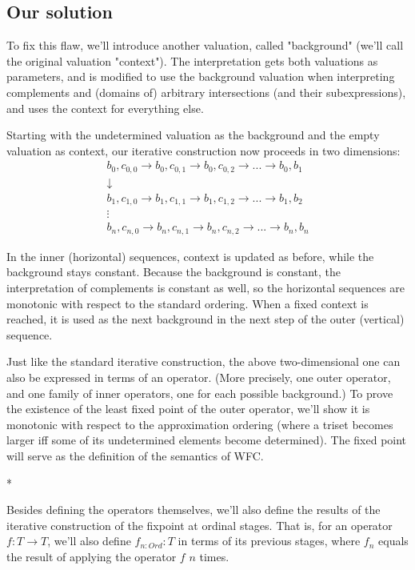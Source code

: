 \documentclass[oneside,12pt]{book}
\theoremstyle{definition}
\theoremstyle{remark}
\newcommand{\sectionStars}{
\bigskip
*\quad*\quad*
\medskip
}
\begin{document}
\subsection{Our solution}
To fix this flaw, we'll introduce another valuation, called "background"
(we'll call the original valuation "context"). The interpretation gets both
valuations as parameters, and is modified to use the background valuation when
interpreting complements and (domains of) arbitrary intersections (and their
subexpressions), and uses the context for everything else.

Starting with the undetermined valuation as the background and the empty valuation
as context, our iterative construction now proceeds in two dimensions:
\begin{gather*}
  b_0, c_{0,0} \rightarrow b_0, c_{0,1} \rightarrow b_0, c_{0,2}
    \rightarrow ... \rightarrow b_0, b_1 \\
  \downarrow \\
  b_1, c_{1,0} \rightarrow b_1, c_{1,1} \rightarrow b_1, c_{1,2}
    \rightarrow ... \rightarrow b_1, b_2 \\
  \vdots \\
  b_n, c_{n,0} \rightarrow b_n, c_{n,1} \rightarrow b_n, c_{n,2}
    \rightarrow ... \rightarrow b_n, b_n
\end{gather*}

In the inner (horizontal) sequences, context is updated as before,
while the background stays constant. Because the background is constant,
the interpretation of complements is constant as well, so the horizontal
sequences are monotonic with respect to the standard ordering.
When a fixed context is reached, it is used as the next background in the next
step of the outer (vertical) sequence.

Just like the standard iterative construction, the above two-dimensional one
can also be expressed in terms of an operator. (More precisely, one outer
operator, and one family of inner operators, one for each possible background.)
To prove the existence of the least fixed point of the outer operator, we'll show
it is monotonic with respect to the approximation ordering (where a triset
becomes larger iff some of its undetermined elements become determined).
The fixed point will serve as the definition of the semantics of WFC.

\sectionStars

\noindent Besides defining the operators themselves, we'll also define the results
of the iterative construction of the fixpoint at ordinal stages. That is, for
an operator $f\colon T \to T$, we'll also define $f_{n\colon Ord}\colon T$
in terms of its previous stages, where $f_n$ equals the result of applying
the operator $f$ $n$ times.
\end{document}
